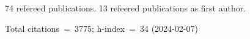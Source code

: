 74 refereed publications. 13 refeered publications as first author.

Total citations~=~3775; h-index~=~34 (2024-02-07)